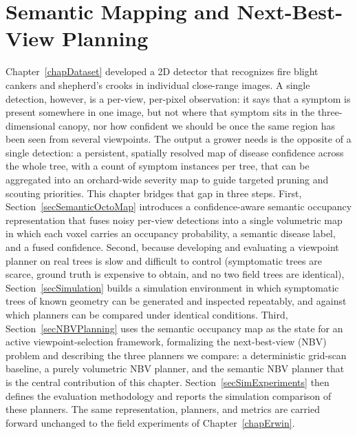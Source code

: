 
\chapter{Semantic Mapping and Next-Best-View Planning} \label{chapNBV}

Chapter~\ref{chapDataset} developed a 2D detector that recognizes fire
blight cankers and shepherd's crooks in individual close-range images.
A single detection, however, is a per-view, per-pixel observation: it says
that a symptom is present somewhere in one image, but not where that
symptom sits in the three-dimensional canopy, nor how confident we should
be once the same region has been seen from several viewpoints.
The output a grower needs is the opposite of a single detection: a
persistent, spatially resolved map of disease confidence across the whole
tree, with a count of symptom instances per tree, that can be aggregated
into an orchard-wide severity map to guide targeted pruning and scouting
priorities.
This chapter bridges that gap in three steps.
First, Section~\ref{secSemanticOctoMap} introduces a confidence-aware
semantic occupancy representation that fuses noisy per-view detections into
a single volumetric map in which each voxel carries an occupancy
probability, a semantic disease label, and a fused confidence.
Second, because developing and evaluating a viewpoint planner on real
trees is slow and difficult to control (symptomatic trees are scarce,
ground truth is expensive to obtain, and no two field trees are
identical), Section~\ref{secSimulation} builds a simulation environment in
which symptomatic trees of known geometry can be generated and inspected
repeatably, and against which planners can be compared under identical
conditions.
Third, Section~\ref{secNBVPlanning} uses the semantic occupancy map as the
state for an active viewpoint-selection framework, formalizing the
next-best-view (NBV) problem and describing the three planners we
compare: a deterministic grid-scan baseline, a purely volumetric NBV
planner, and the semantic NBV planner that is the central contribution of
this chapter.
Section~\ref{secSimExperiments} then defines the evaluation methodology
and reports the simulation comparison of these planners.
The same representation, planners, and metrics are carried forward
unchanged to the field experiments of Chapter~\ref{chapErwin}.


